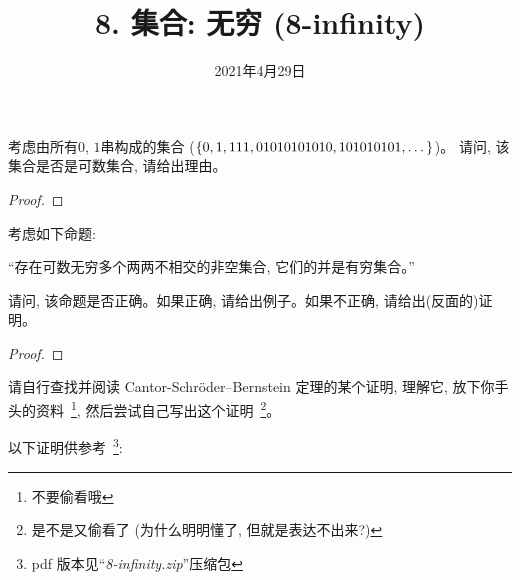 \documentclass[a4paper, justified]{tufte-handout}
\title{8. 集合: 无穷 (8-infinity)}
\date{2021年4月29日}
\begin{document}
\maketitle
\noplagiarism %
\begin{abstract}
\end{abstract}
\beginrequired

\begin{problem}
  考虑由所有$0$, $1$串构成的集合 ($\{0, 1, 111, 01010101010, 101010101, \dots\}$)。
  请问, 该集合是否是可数集合, 请给出理由。
\end{problem}

\begin{proof}
\end{proof}

\begin{problem}
  考虑如下命题:

  ``存在可数无穷多个两两不相交的非空集合, 它们的并是有穷集合。''

  \noindent 请问, 该命题是否正确。如果正确, 请给出例子。如果不正确, 请给出(反面的)证明。
\end{problem}

\begin{proof}
\end{proof}

\begin{problem}
  请自行查找并阅读 Cantor-Schr\"{o}der–Bernstein 定理的某个证明,
  理解它, 放下你手头的资料~\footnote{不要偷看哦}, 然后尝试自己写出这个证明~\footnote{
    是不是又偷看了 (为什么明明懂了, 但就是表达不出来?)}。

  \vspace{1em}
  \noindent 以下证明供参考~\footnote{pdf 版本见``\textsl{8-infinity.zip}''压缩包}:
  {\href{https://en.wikipedia.org/wiki/Schr\%C3\%B6der\%E2\%80\%93Bernstein\_theorem}{}}
\end{problem}
\end{document}
